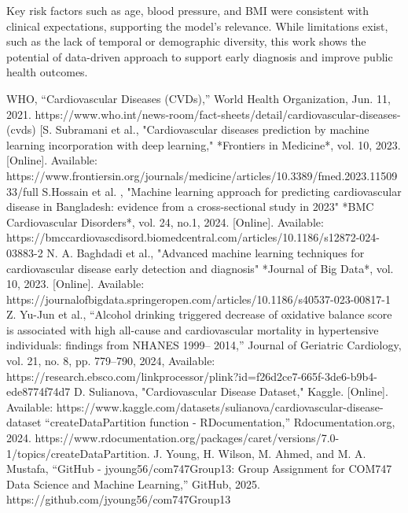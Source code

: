 \documentclass[conference]{IEEEtran}
\begin{document}
Key risk factors such as age, blood pressure, and BMI were consistent with clinical expectations, supporting the model's relevance. While limitations exist, such as the lack of temporal or demographic diversity, this work shows the potential of data-driven approach to support early diagnosis and improve public health outcomes.





\begin{thebibliography}{00}
 WHO, “Cardiovascular Diseases (CVDs),” World Health Organization, Jun. 11, 2021. https://www.who.int/news-room/fact-sheets/detail/cardiovascular-diseases-(cvds)
 [S. Subramani et al., "Cardiovascular diseases prediction by machine learning incorporation with deep learning," *Frontiers in Medicine*, vol. 10, 2023. [Online]. Available: https://www.frontiersin.org/journals/medicine/articles/10.3389/fmed.2023.1150933/full
 S.Hossain et al. , "Machine learning approach for predicting cardiovascular disease in Bangladesh: evidence from a cross-sectional study in 2023" *BMC Cardiovascular Disorders*, vol. 24, no.1, 2024. [Online]. Available: https://bmccardiovascdisord.biomedcentral.com/articles/10.1186/s12872-024-03883-2 
 N. A. Baghdadi et al., "Advanced machine learning techniques for cardiovascular disease early detection and diagnosis" *Journal of Big Data*, vol. 10, 2023. [Online]. Available: https://journalofbigdata.springeropen.com/articles/10.1186/s40537-023-00817-1
 Z. Yu-Jun et al., “Alcohol drinking triggered decrease of oxidative balance score is associated with high all-cause and cardiovascular mortality in hypertensive individuals: findings from NHANES 1999– 2014,” Journal of Geriatric Cardiology, vol. 21, no. 8, pp. 779–790, 2024, Available: https://research.ebsco.com/linkprocessor/plink?id=f26d2ce7-665f-3de6-b9b4-ede8774f74d7
 D. Sulianova, "Cardiovascular Disease Dataset," Kaggle. [Online]. Available: https://www.kaggle.com/datasets/sulianova/cardiovascular-disease-dataset
 “createDataPartition function - RDocumentation,” Rdocumentation.org, 2024. https://www.rdocumentation.org/packages/caret/versions/7.0-1/topics/createDataPartition.
 J. Young, H. Wilson, M. Ahmed, and M. A. Mustafa, “GitHub - jyoung56/com747Group13: Group Assignment for COM747 Data Science and Machine Learning,” GitHub, 2025. https://github.com/jyoung56/com747Group13

\end{thebibliography}
\end{document}
